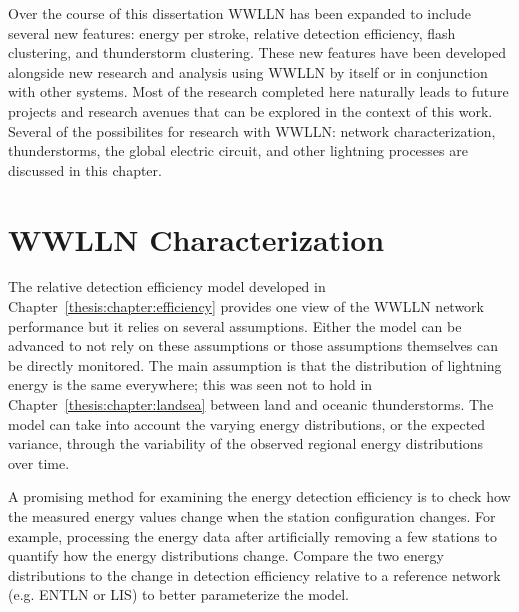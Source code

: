 

Over the course of this dissertation WWLLN has been expanded to include several new features: energy per stroke, relative detection efficiency, flash clustering, and thunderstorm clustering.
These new features have been developed alongside new research and analysis using WWLLN by itself or in conjunction with other systems.
Most of the research completed here naturally leads to future projects and research avenues that can be explored in the context of this work.
Several of the possibilites for research with WWLLN: network characterization, thunderstorms, the global electric circuit, and other lightning processes are discussed in this chapter.

\section{WWLLN Characterization}

The relative detection efficiency model developed in Chapter~\ref{thesis:chapter:efficiency} provides one view of the WWLLN network performance but it relies on several assumptions.
Either the model can be advanced to not rely on these assumptions or those assumptions themselves can be directly monitored.
The main assumption is that the distribution of lightning energy is the same everywhere; this was seen not to hold in Chapter~\ref{thesis:chapter:landsea} between land and oceanic thunderstorms.
The model can take into account the varying energy distributions, or the expected variance, through the variability of the observed regional energy distributions over time.

A promising method for examining the energy detection efficiency is to check how the measured energy values change when the station configuration changes.
For example, processing the energy data after artificially removing a few stations to quantify how the energy distributions change.
Compare the two energy distributions to the change in detection efficiency relative to a reference network (e.g. ENTLN or LIS) to better parameterize the model.

